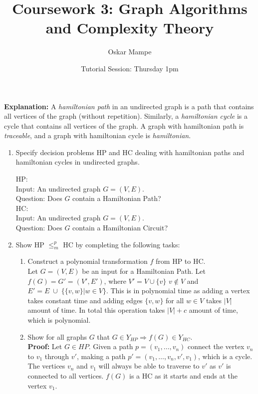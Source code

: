 \documentclass[11pt,a4paper]{article}
\title{Coursework 3: Graph Algorithms and Complexity Theory}
\author{Oskar Mampe}
\date{Tutorial Session: Thursday 1pm}
\newcommand{\hc} {HC}
\newcommand{\hp} {HP}
\begin{document}
\maketitle
\thispagestyle{empty}

\textbf{Explanation: } A \textit{hamiltonian path} in an undirected graph is a path that contains all vertices of the graph (without repetition).  Similarly, a \textit{hamiltonian cycle} is a cycle that contains all vertices of the graph.  A graph with hamiltonian path is \textit{traceable}, and a graph with hamiltonian cycle is \textit{hamiltonian}.

\begin{enumerate}
    \item Specify decision problems \hp{} and \hc{}  dealing with hamiltonian paths and hamiltonian cycles in undirected graphs.
    
    \hp{}:\\ Input: An undirected graph $G = (V, E)$.\\ Question: Does $G$ contain a Hamiltonian Path?\\


    \hc{}:\\ Input: An undirected graph $G = (V, E)$.\\ Question: Does $G$ contain a Hamiltonian Circuit?\\

    \item Show \hp{} $\leq^p_m$ \hc{} by completing the following tasks: 
        \begin{enumerate}
            \item Construct a polynomial transformation $f$ from \hp{} to \hc{}.\\
            Let $G = (V, E)$ be an input for a Hamiltonian Path. Let $f(G) = G'  = (V', E')$,
             where $V' = V \cup \{v\}$ $v \notin V$ and $E' = E \; \cup  \; \{ \{ v, w\} | w \in V\}$.
             This is in polynomial time as adding a vertex takes constant time and adding edges $\{v, w \}$
              for all $w \in V$ takes $|V|$ amount of time. In total this operation takes $|V| + c$ amount of time, which is polynomial. 

            \item Show for all graphs $G$ that $G \in Y_{\hp{}} \Rightarrow f(G) \in Y_{\hc{}}$.\\
            \textbf{Proof: }  Let $G \in \hp{}$.
             Given a path $p = (v_1, \ldots, v_n)$ connect the vertex $v_n$ to $v_1$ through $v'$,
              making a path $p' = (v_1, \ldots, v_n, v', v_1)$, which is a cycle.
               The vertices $v_n$ and $v_1$ will always be able to traverse to $v'$
                as $v'$ is connected to all vertices. $f(G)$ is a \hc{} as it starts and ends at the vertex $v_1$.\\
                

\end{enumerate}
\end{enumerate}
\end{document}
